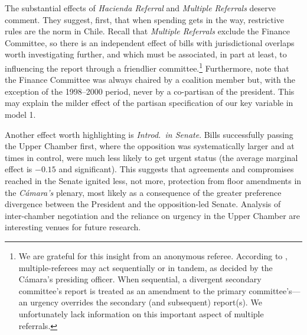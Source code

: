 \documentclass[letter,12pt]{article}
\begin{document}
The substantial effects of \emph{Hacienda Referral} and \emph{Multiple Referrals} deserve comment. They suggest, first, that when spending gets in the way, restrictive rules are the norm in Chile. Recall that \emph{Multiple Referrals} exclude the Finance Committee, so there is an independent effect of bills with jurisdictional overlaps worth investigating further, and which must be associated, in part at least, to influencing the report through a friendlier committee.\footnote{We are grateful for this insight from an anonymous referee. According to \citet[][, 118]{sotoCongChile2015}, multiple-referees may act sequentially or in tandem, as decided by the C\'amara's presiding officer. When sequential, a divergent secondary committee's report is treated as an amendment to the primary committee's---an urgency overrides the secondary (and subsequent) report(s). We unfortunately lack information on this important aspect of multiple referrals.} Furthermore, note that the Finance Committee was always chaired by a coalition member but, with the exception of the 1998--2000 period, never by a co-partisan of the president. This may explain the milder effect of the partisan specification of our key variable in model 1. 

Another effect worth highlighting is \emph{Introd.\ in Senate}. Bills successfully passing the Upper Chamber first, where the opposition was systematically larger and at times in control, were much less likely to get urgent status (the average marginal effect is $-0.15$ and significant). This suggests that agreements and compromises reached in the Senate ignited less, not more, protection from floor amendments in the \emph{C\'amara's} plenary, most likely as a consequence of the greater preference divergence between the President and the opposition-led Senate. Analysis of inter-chamber negotiation and the reliance on urgency in the Upper Chamber are interesting venues for future research. 

\end{document}
